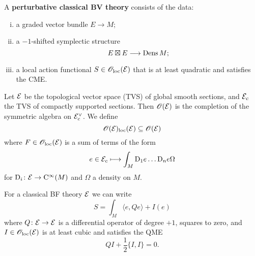 \begin{definition}
  A \textbf{perturbative classical BV theory} consists of the data:
  \begin{enumerate}[i)]
    \item a graded vector bundle $E \to M$;
    \item a $-1$-shifted symplectic structure
    \begin{equation*}
      E \boxtimes E \longrightarrow \operatorname{Dens} M;
    \end{equation*}
    \item a local action functional $S \in \mathscr{O}_{\text{loc}}(\mathcal{E})$ that is at least quadratic and satisfies the CME.
  \end{enumerate}
  Let $\mathcal{E}$ be the topological vector space (TVS) of global smooth sections, and $\mathcal{E}_c$ the TVS of compactly supported sections.
  Then $\mathscr{O}(\mathcal{E})$ is the completion of the symmetric algebra on $\mathcal{E}_c^{\vee}$.
  We define
  \begin{equation*}
    \mathscr{O}(\mathcal{E})_{\text{loc}} (\mathcal{E}) \subseteq \mathscr{O}(\mathcal{E})
  \end{equation*}
  where $F \in \mathscr{O}_{\text{loc}} (\mathcal{E})$ is a sum of terms of the form
  \begin{equation*}
    e \in \mathcal{E}_c \longmapsto
    \int_M \mathrm{D}_1 e \dots \mathrm{D}_n e \Omega
  \end{equation*}
  for $\mathrm{D}_i \colon \mathcal{E} \to \mathrm{C}^{\infty} (M)$ and $\Omega$ a density on $M$.
\end{definition}

\begin{proposition}
  For a classical BF theory $\mathcal{E}$ we can write
  \begin{equation*}
    S = \int_M \langle e, Q e \rangle + I(e)
  \end{equation*}
  where $Q \colon \mathcal{E} \to \mathcal{E}$ is a differential operator of degree $+1$, squares to zero, and $I \in \mathscr{O}_{\text{loc}}(\mathcal{E})$ is at least cubic and satisfies the QME
  \begin{equation*}
    Q I + \frac{1}{2} \{ I, I \} = 0.
  \end{equation*}
\end{proposition}
